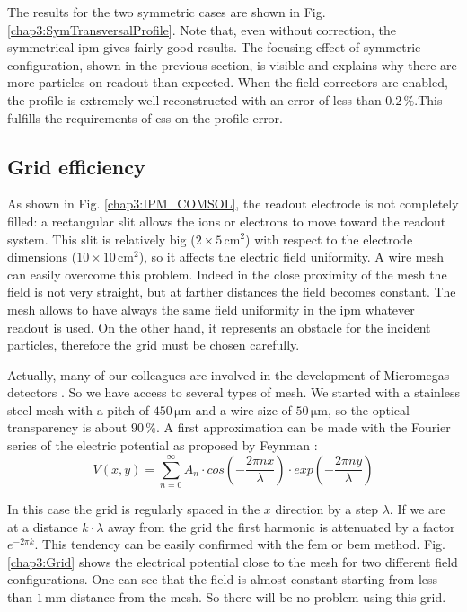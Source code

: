 \begin{refsection}
  The results for the two symmetric cases are shown in Fig. \ref{chap3:SymTransversalProfile}. Note that, even without correction, the symmetrical \acrshort{ipm} gives fairly good results. The focusing effect of symmetric configuration, shown in the previous section, is visible and explains why there are more particles on readout than expected. When the field correctors are enabled, the profile is extremely well reconstructed with an error of less than $0.2\,\mathrm{\%}$.This fulfills the requirements of \acrshort{ess} on the profile error.
  

  \subsection{Grid efficiency}
  \label{chap3:sec:grid}
  As shown in Fig. \ref{chap3:IPM_COMSOL}, the readout electrode is not completely filled: a rectangular slit allows the ions or electrons to move toward the readout system. This slit is relatively big ($2\times5\,\mathrm{cm^{2}}$) with respect to the electrode dimensions ($10\times10\,\mathrm{cm^{2}}$), so it affects the electric field uniformity. A wire mesh can easily overcome this problem. Indeed in the close proximity of the mesh the field is not very straight, but at farther distances the field becomes constant. The mesh allows to have always the same field uniformity in the \acrshort{ipm} whatever readout is used. On the other hand, it represents an obstacle for the incident particles, therefore the grid must be chosen carefully.

  Actually, many of our colleagues are involved in the development of Micromegas detectors \cite{GIOMATARIS199629}. So we have access to several types of mesh. We started with a stainless steel mesh with a pitch of $450\,\mathrm{\mu m}$ and a wire size of $50\,\mathrm{\mu m}$, so the optical transparency is about $90\,\mathrm{\%}$. A first approximation can be made with the Fourier series of the electric potential as proposed by Feynman \cite{feynman2011feynman}:
  \begin{equation}
    V(x,y)= \sum^{\infty}_{n=0} A_{n} \cdot cos(-\frac{2\pi n x}{\lambda}) \cdot exp(-\frac{2\pi n y}{\lambda})
  \end{equation}

  In this case the grid is regularly spaced in the $x$ direction by a step $\lambda$. If we are at a distance $k \cdot \lambda$ away from the grid the first harmonic is attenuated by a factor $e^{-2\pi k}$. This tendency can be easily confirmed with the \acrshort{fem} or \acrshort{bem} method. Fig. \ref{chap3:Grid} shows the electrical potential close to the mesh for two different field configurations. One can see that the field is almost constant starting from less than $1\,\mathrm{mm}$ distance from the mesh. So there will be no problem using this grid.
  


\end{refsection}
